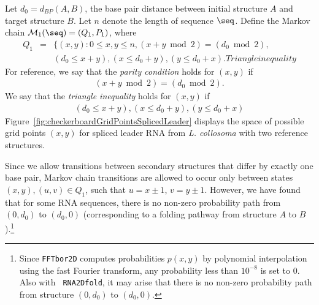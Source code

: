 \begin{description}
Let $d_0= d_{BP}(A,B)$, the base pair distance between initial structure
$A$ and target structure $B$.  Let $n$ denote the length of sequence $\seq$.
Define the Markov chain $\mathcal{M}_1(\seq) = (Q_1,P_1)$, where
\begin{eqnarray}
\label{eqn:defQ1} Q_1 &=& \{ (x,y) : 0 \leq x,y \leq n, (x+y \bmod 2)
= (d_0 \bmod 2), \\ %
& & (d_0 \leq x+y), (x \leq d_0 + y), (y \leq d_0 + x). \nonumber %
Triangle inequality
\end{eqnarray}
For reference, we say that the {\em parity condition} holds for
$(x,y)$ if
\begin{eqnarray}
\label{eqn:parityCondition} (x+y \bmod 2) = (d_0 \bmod 2).
\end{eqnarray}
We say that the {\em triangle inequality} holds for $(x,y)$ if
\begin{eqnarray}
\label{eqn:triangleInequality} (d_0 \leq x+y), (x \leq d_0 + y), (y
\leq d_0 + x)
\end{eqnarray}
Figure~\ref{fig:checkerboardGridPointsSplicedLeader} displays the
space of possible grid points $(x,y)$ for spliced leader RNA from {\em
L. collosoma} with two reference structures.

Since we allow transitions between secondary structures that differ by
exactly one base pair, Markov chain transitions are allowed to occur
only between states $(x,y),(u,v) \in Q_1$, such that $u=x\pm 1$, $v =
y \pm 1$. However, we have found that for some RNA sequences, there is
no non-zero probability path from $(0,d_0)$ to $(d_0,0)$
(corresponding to a folding pathway from structure $A$ to
$B$).\footnote{Since {\tt FFTbor2D} computes probabilities $p(x,y)$ by
polynomial interpolation using the fast Fourier transform, any
probability less than $10^{-8}$ is set to $0$. Also with {\tt
RNA2Dfold}, it may arise that there is no non-zero probability path
from structure $(0,d_0)$ to $(d_0,0)$.}


\end{description}

